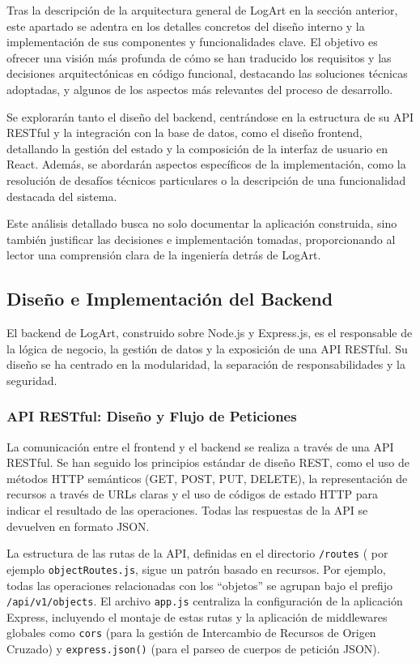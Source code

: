 Tras la descripción de la arquitectura general de LogArt en la sección anterior, este apartado se adentra en los detalles concretos del diseño interno y la implementación de sus componentes y funcionalidades clave. El objetivo es ofrecer una visión más profunda de cómo se han traducido los requisitos y las decisiones arquitectónicas en código funcional, destacando las soluciones técnicas adoptadas, y algunos de los aspectos más relevantes del proceso de desarrollo.

Se explorarán tanto el diseño del backend, centrándose en la estructura de su API RESTful y la integración con la base de datos, como el diseño frontend, detallando la gestión del estado y la composición de la interfaz de usuario en React. Además, se abordarán aspectos específicos de la implementación, como la resolución de desafíos técnicos particulares o la descripción de una funcionalidad destacada del sistema. 

Este análisis detallado busca no solo documentar la aplicación construida, sino también justificar las decisiones e implementación tomadas, proporcionando al lector una comprensión clara de la ingeniería detrás de LogArt.

\subsection{Diseño e Implementación del Backend}
\label{ssec:disenoImplBackend}

El backend de LogArt, construido sobre Node.js y Express.js, es el responsable de la lógica de negocio, la gestión de datos y la exposición de una API RESTful. Su diseño se ha centrado en la modularidad, la separación de responsabilidades y la seguridad.

\subsubsection{API RESTful: Diseño y Flujo de Peticiones}
\label{sssec:apiRestfulDiseno}

La comunicación entre el frontend y el backend se realiza a través de una API RESTful. Se han seguido los principios estándar de diseño REST, como el uso de métodos HTTP semánticos (GET, POST, PUT, DELETE), la representación de recursos a través de URLs claras y el uso de códigos de estado HTTP para indicar el resultado de las operaciones. Todas las respuestas de la API se devuelven en formato JSON.

La estructura de las rutas de la API, definidas en el directorio \texttt{/routes} ( por ejemplo \texttt{objectRoutes.js}, sigue un patrón basado en recursos. Por ejemplo, todas las operaciones relacionadas con los ``objetos'' se agrupan bajo el prefijo \texttt{/api/v1/objects}. El archivo \texttt{app.js} centraliza la configuración de la aplicación Express, incluyendo el montaje de estas rutas y la aplicación de middlewares globales como \texttt{cors} (para la gestión de Intercambio de Recursos de Origen Cruzado) y \texttt{express.json()} (para el parseo de cuerpos de petición JSON).

